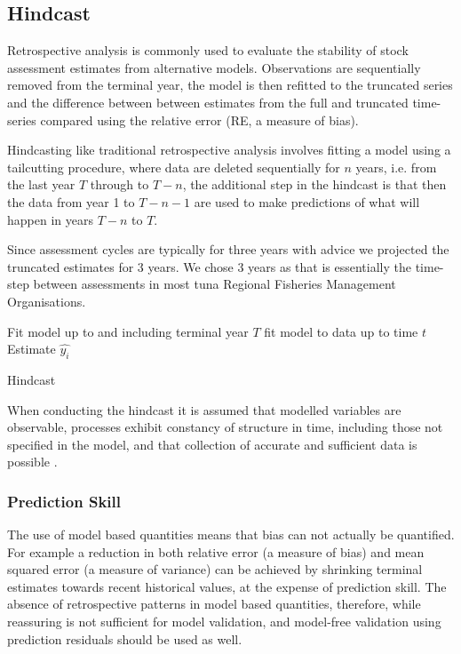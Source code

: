 
\subsection{Hindcast}

Retrospective analysis  \parencite{hurtado2014looking} is commonly used to evaluate the stability of stock assessment estimates from alternative models. Observations are sequentially removed from the terminal year, the model is then refitted to the truncated series and the difference between between estimates from the full and truncated time-series compared using the relative error (RE, a measure of bias). 

Hindcasting like traditional retrospective analysis involves fitting a model using a tailcutting procedure, where data are deleted sequentially for $n$ years, i.e. from the last year $T$ through to $T−n$, the additional step in the hindcast is that then the data from year 1 to $T - n - 1$ are used to make predictions of what will happen in years $T - n$ to $T$.

Since assessment cycles are typically for three years  with advice \parencite{fricker2013three} we projected the truncated estimates for 3 years. We chose 3 years as that is essentially the time-step between assessments in most tuna Regional Fisheries Management Organisations.

\begin{algorithm}[!ht]
\begin{algorithmic}[1]
\State Fit model up to and including terminal year $T$
\State fit model to data up to time $t$  
\State Estimate $\hat{y_i}$
\EndFor
\EndFor
\caption{Hindcast}
\label{Hindcast}
\end{algorithmic}
\end{algorithm}

When conducting the hindcast it is assumed that modelled variables are observable, processes exhibit constancy of structure in time, including those not specified in the model, and that collection of accurate and sufficient data is possible \parencite{hodges1992you}.

\subsubsection{Prediction Skill}

The use of model based quantities means that bias can not actually be quantified. For example a reduction in both relative error (a measure of bias) and mean squared error (a measure of variance) can be achieved by shrinking terminal estimates towards recent historical values, at the expense of prediction skill. The absence of retrospective patterns in model based quantities, therefore, while reassuring is not sufficient for model validation, and model-free validation using prediction residuals should be used as well.

